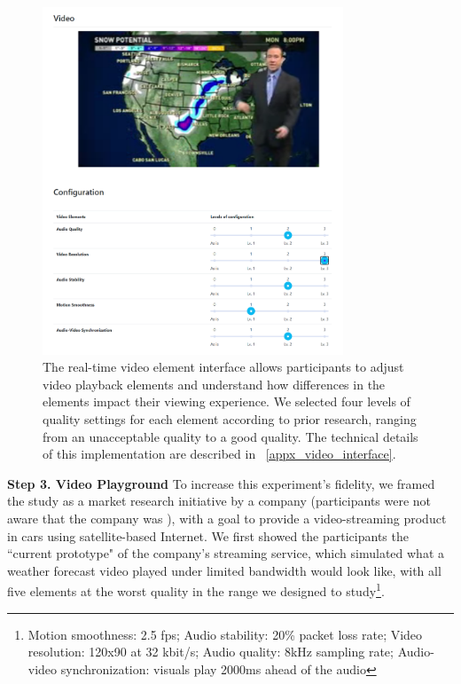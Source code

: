 \begin{figure}[htpb]
    \centering
    \includegraphics[width=0.8\textwidth, keepaspectratio=true]{content/image/video_playground.png}
    \caption{
        The real-time video element interface allows participants to adjust video playback elements and understand how differences in the elements impact their viewing experience. We selected four levels of quality settings for each element according to prior research, ranging from an unacceptable quality to a good quality. The technical details of this implementation are described in ~\cref{appx_video_interface}.
    }
    \label{fig:exp2_playground}
\end{figure}

\textbf{Step 3. Video Playground} To increase this experiment's fidelity, we framed the study as a market research initiative by a {} company (participants were not aware that the company was {}), with a goal to provide a video-streaming product in cars using satellite-based Internet. We first showed the participants the ``current prototype" of the company's streaming service, which simulated what a weather forecast video played under limited bandwidth would look like, with all five elements at the worst quality in the range we designed to study\footnote{Motion smoothness: 2.5 fps; Audio stability: 20\% packet loss rate; Video resolution: 120x90 at 32 kbit/s; Audio quality: 8kHz sampling rate; Audio-video synchronization: visuals play 2000ms ahead of the audio}. 

